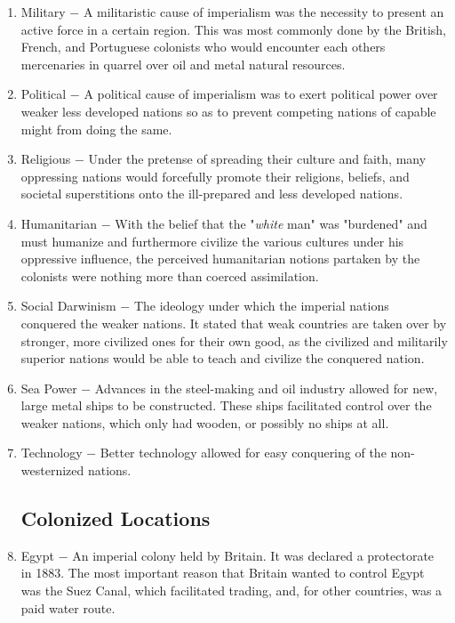 \documentclass[12pt]{article}
\begin{document}
\begin{enumerate}
\item Military $-$ A militaristic cause of imperialism was the necessity to present an active force in a certain region. This was most commonly done by the British, French, and Portuguese colonists who would encounter each others mercenaries in quarrel over oil and metal natural resources.

\item Political $-$ A political cause of imperialism was to exert political power over weaker less developed nations so as to prevent competing nations of capable might from doing the same. 

\item Religious $-$ Under the pretense of spreading their culture and faith, many oppressing nations would forcefully promote their religions, beliefs, and societal superstitions onto the ill-prepared and less developed nations.

\item Humanitarian $-$ With the belief that the "\textit{white} man" was "burdened" and must humanize and furthermore civilize the various cultures under his oppressive influence, the perceived humanitarian notions partaken by the colonists were nothing more than coerced assimilation. 

\item Social Darwinism $-$ The ideology under which the imperial nations conquered the weaker nations. It stated that weak countries are taken over by stronger, more civilized ones for their own good, as the civilized and militarily superior nations would be able to teach and civilize the conquered nation.  

\item Sea Power $-$ Advances in the steel-making and oil industry allowed for new, large metal ships to be constructed. These ships facilitated control over the weaker nations, which only had wooden, or possibly no ships at all.

\item Technology $-$ Better technology allowed for easy conquering of the non-westernized nations.

\subsection{Colonized Locations}

\item Egypt $-$ An imperial colony held by Britain. It was declared a protectorate in 1883. The most important reason that Britain wanted to control Egypt was the Suez Canal, which facilitated trading, and, for other countries, was a paid water route.


\end{enumerate}
\end{document}
